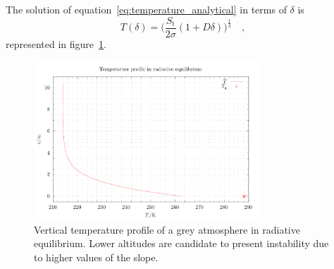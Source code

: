 \documentclass[a4paper,10pt,twocolumn,\classoptions]{article}
\begin{document}
The solution of equation~\eqref{eq:temperature_analytical} in terms of $\delta$ is
\begin{equation}
  \label{eq:temperature_analytical_solution}
  T(\delta) = \bigg( \frac{S_\text{t}}{2 \sigma} (1 + D \delta) \bigg)^\frac{1}{4}
  \quad ,
\end{equation}
represented in figure~\ref{fig:temperature_radiative_equilibrium}.
\begin{figure}[h]
  \centering
  \includegraphics*[keepaspectratio=true,width=0.75\textwidth]{temperature_radiative_equilibrium}
  \caption{Vertical temperature profile of a grey atmosphere in radiative equilibrium. Lower altitudes are candidate to present instability due to higher values of the slope.}
  \label{fig:temperature_radiative_equilibrium}
\end{figure}
\end{document}
